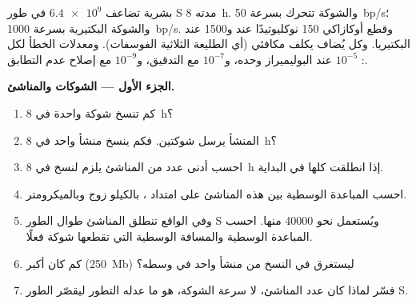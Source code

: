 \begin{problem}
\label{pb:b1:replication-mitosis:1}
 بشرية تضاعف $\num{6.4e9}$  في طور S مدته \qty{8}{h}.
والشوكة  تتحرك بسرعة \qty{50}{bp/s}؛ والشوكة
البكتيرية بسرعة \qty{1000}{bp/s}. وقطع أوكازاكي \qty{150}{} نوكليوتيدًا عند
 و\qty{1500}{} عند البكتيريا. وكل  يُضاف يكلف
مكافئي  (أي الطليعة الثلاثية الفوسفات). ومعدلات الخطأ لكل :
$10^{-5}$ عند البوليميراز وحده، و$10^{-7}$ مع التدقيق،
و$10^{-9}$ مع إصلاح عدم التطابق.

\medskip
\noindent\textbf{الجزء الأول --- الشوكات والمناشئ.}
\begin{enumerate}
  \item كم  تنسخ شوكة واحدة في \qty{8}{h}؟
  \item المنشأ يرسل شوكتين. فكم  ينسخ منشأ واحد في
        \qty{8}{h}؟
  \item احسب أدنى عدد من المناشئ يلزم لنسخ  في \qty{8}{h} إذا
        انطلقت كلها في البداية.
  \item احسب المباعدة الوسطية بين هذه المناشئ على امتداد ،
        بالكيلو زوج وبالميكرومتر.
  \item وفي الواقع تنطلق المناشئ طوال الطور S ويُستعمل نحو
        \num{40000} منها. احسب المباعدة الوسطية والمسافة الوسطية التي
        تقطعها شوكة فعلًا.
  \item كم كان أكبر  (\qty{250}{Mb}) ليستغرق في النسخ من منشأ
        واحد في وسطه؟
  \item فسّر لماذا كان عدد المناشئ، لا سرعة الشوكة، هو ما عدله التطور
        ليقصّر الطور S.
\end{enumerate}


\end{problem}
